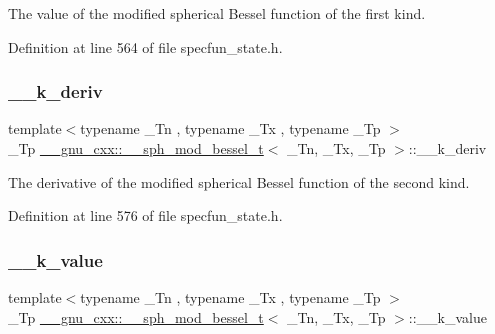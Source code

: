 The value of the modified spherical Bessel function of the first kind. 



Definition at line 564 of file specfun\+\_\+state.\+h.

\mbox{\label{struct____gnu__cxx_1_1____sph__mod__bessel__t_a4a291581457934e9d05c21e2acbedbc5}} 
\subsubsection{\texorpdfstring{\+\_\+\+\_\+k\+\_\+deriv}{\_\_k\_deriv}}
{\footnotesize\ttfamily template$<$typename \+\_\+\+Tn , typename \+\_\+\+Tx , typename \+\_\+\+Tp $>$ \\
\+\_\+\+Tp \hyperlink{struct____gnu__cxx_1_1____sph__mod__bessel__t}{\+\_\+\+\_\+gnu\+\_\+cxx\+::\+\_\+\+\_\+sph\+\_\+mod\+\_\+bessel\+\_\+t}$<$ \+\_\+\+Tn, \+\_\+\+Tx, \+\_\+\+Tp $>$\+::\+\_\+\+\_\+k\+\_\+deriv}



The derivative of the modified spherical Bessel function of the second kind. 



Definition at line 576 of file specfun\+\_\+state.\+h.

\mbox{\label{struct____gnu__cxx_1_1____sph__mod__bessel__t_af0e430aef3e7053de5474206d6f13830}} 
\subsubsection{\texorpdfstring{\+\_\+\+\_\+k\+\_\+value}{\_\_k\_value}}
{\footnotesize\ttfamily template$<$typename \+\_\+\+Tn , typename \+\_\+\+Tx , typename \+\_\+\+Tp $>$ \\
\+\_\+\+Tp \hyperlink{struct____gnu__cxx_1_1____sph__mod__bessel__t}{\+\_\+\+\_\+gnu\+\_\+cxx\+::\+\_\+\+\_\+sph\+\_\+mod\+\_\+bessel\+\_\+t}$<$ \+\_\+\+Tn, \+\_\+\+Tx, \+\_\+\+Tp $>$\+::\+\_\+\+\_\+k\+\_\+value}



